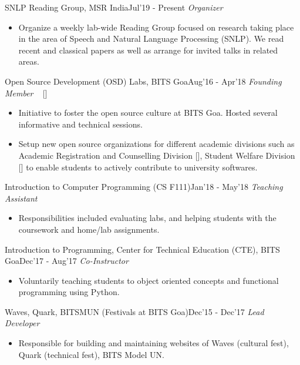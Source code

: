 
\begin{projects}

\projecta
	{SNLP Reading Group, MSR India}{Jul'19 - Present}
	{
	    \textit{Organizer}
	}
	{\begin{itemize}
     \item Organize a weekly lab-wide Reading Group focused on research taking place in the area of Speech and Natural Language Processing (SNLP). We read recent and classical papers as well as arrange for invited talks in related areas.
     \end{itemize}}
     
\projecta
	{Open Source Development (OSD) Labs, BITS Goa}{Aug'16 - Apr'18}
	{
	    \textit{Founding Member} ~ [\href{https://github.com/OSDLabs}{\small{\githubSymbol}}]
	}
	{\begin{itemize}
     \item Initiative to foster the open source culture at BITS Goa. Hosted several informative and technical sessions.
     \item Setup new open source organizations for different academic divisions such as  Academic Registration and Counselling Division [\href{https://github.com/swd-bits-goa}{\small{\githubSymbol}}], Student Welfare Division [\href{https://github.com/arc-bits-goa}{\small{\githubSymbol}}] to enable students to actively contribute to university softwares.
     \end{itemize}}
 
\projecta
	{Introduction to Computer Programming (CS F111)}{Jan'18 - May'18}
	{
	    \textit{Teaching Assistant}
	}
	{\begin{itemize}
     \item Responsibilities included evaluating labs, and helping students with the coursework and home/lab assignments. 
     \end{itemize}}
     
\projecta
	{Introduction to Programming, Center for Technical Education (CTE), BITS Goa}{Dec'17 - Aug'17}
	{
	    \textit{Co-Instructor}
	}
	{\begin{itemize}
     \item  Voluntarily teaching students to object oriented concepts and functional programming using Python. 
     \end{itemize}}  

\projecta
	{Waves, Quark, BITSMUN (Festivals at BITS Goa)}{Dec'15 - Dec'17}
	{
	    \textit{Lead Developer}
	}
	{\begin{itemize}
     \item Responsible for building and maintaining websites of {Waves} (cultural fest),  {Quark} (technical fest),  BITS Model UN.  
     \end{itemize}}
\end{projects}
\vspace{-3mm}
